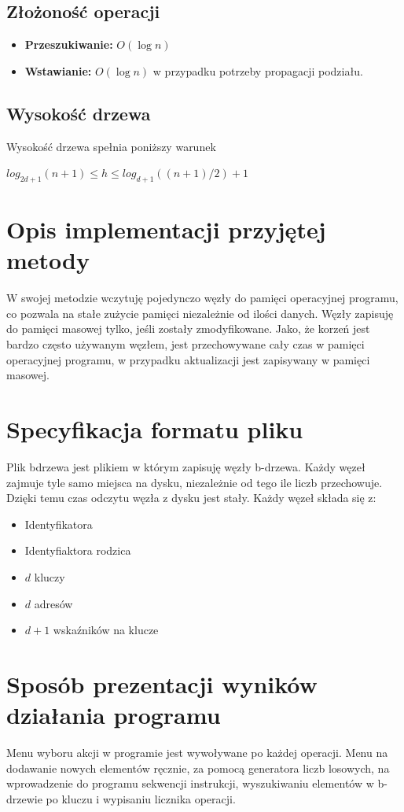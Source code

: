 \documentclass{article}
\begin{document}
\subsection{Złożoność operacji}
\begin{itemize}
    \item \textbf{Przeszukiwanie:} $O(\log n)$
    \item \textbf{Wstawianie:} $O(\log n)$ w przypadku potrzeby propagacji podziału.
\end{itemize}
\subsection{Wysokość drzewa}
Wysokość drzewa spełnia poniższy warunek
\begin{center}
    $log_{2d+1} (n+1) \le h \le log_{d+1} ((n+1)/2)+1$
\end{center}

\section{Opis implementacji przyjętej metody}
W swojej metodzie wczytuję pojedynczo węzły do pamięci operacyjnej programu, co pozwala na stałe zużycie pamięci niezależnie od ilości danych. Węzły zapisuję do pamięci masowej tylko, jeśli zostały zmodyfikowane. Jako, że korzeń jest bardzo często używanym węzłem, jest przechowywane cały czas w pamięci operacyjnej programu, w przypadku aktualizacji jest zapisywany w pamięci masowej.


\section{Specyfikacja formatu pliku}
Plik bdrzewa jest plikiem w którym zapisuję węzły b-drzewa. Każdy węzeł zajmuje tyle samo miejsca na dysku, niezależnie od tego ile liczb przechowuje. Dzięki temu czas odczytu węzła z dysku jest stały. Każdy węzeł składa się z:
\begin{itemize}
    \item Identyfikatora
    \item Identyfiaktora rodzica
    \item $d$ kluczy
    \item $d$ adresów
    \item $d+1$ wskaźników na klucze
\end{itemize}

\section{Sposób prezentacji wyników działania programu}
Menu wyboru akcji w programie jest wywoływane po każdej operacji. Menu na dodawanie nowych elementów ręcznie, za pomocą generatora liczb losowych, na wprowadzenie do programu sekwencji instrukcji, wyszukiwaniu elementów w b-drzewie po kluczu i wypisaniu licznika operacji.
\end{document}
